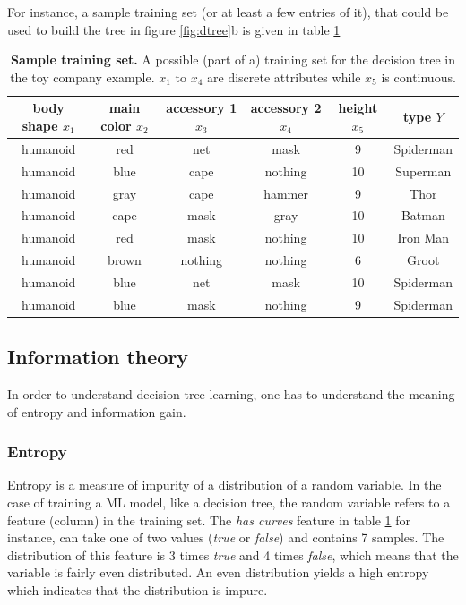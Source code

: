 \documentclass[a4paper]{report}
\begin{document}
    For instance, a sample training set (or at least a few entries of it), that could be used to build the tree in figure \ref{fig:dtree}b is given in table \ref{tab:training-sample}
    \begin{table}
    \centering
    \begin{tabular}{ |c|c|c|c|c||c| }
    \hline
    body shape $x_1$ & main color $x_2$ & accessory 1 $x_3$ & accessory 2 $x_4$ & height $x_5$ & type $Y$\\
    \hline
    humanoid & red & net & mask & 9 & Spiderman \\
    humanoid & blue & cape & nothing & 10 & Superman \\
    humanoid & gray & cape & hammer & 9 & Thor \\
    humanoid & cape & mask & gray & 10 & Batman \\
    humanoid & red & mask & nothing & 10 & Iron Man \\
    humanoid & brown & nothing & nothing & 6 & Groot \\
    humanoid & blue & net & mask & 10 & Spiderman \\
    humanoid & blue & mask & nothing & 9 & Spiderman \\
    \hline
    \end{tabular}
    \caption{\textbf{Sample training set.} A possible (part of a) training set for the decision tree in the toy company example. $x_1$ to $x_4$ are discrete attributes while $x_5$ is continuous.}
    \label{tab:training-sample}
    \end{table}
    
    \subsection{Information theory}
    In order to understand decision tree learning, one has to understand the meaning of entropy and information gain.
    
    \subsubsection{Entropy}
    Entropy is a measure of impurity of a distribution of a random variable. In the case of training a \acs{ML} model, like a decision tree, the random variable refers to a feature (column) in the training set. The \textit{has curves} feature in table \ref{tab:training-sample} for instance, can take one of two values (\textit{true} or \textit{false}) and contains 7 samples. The distribution of this feature is 3 times \textit{true} and 4 times \textit{false}, which means that the variable is fairly even distributed. An even distribution yields a high entropy which indicates that the distribution is impure.
    
\end{document}
